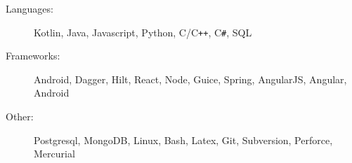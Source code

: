 

\begin{description}
  \item[Languages:]
    \hspace{.4em} 
    Kotlin, Java, Javascript, Python, C/C{}\verb!++!, C{}\verb!#!, SQL
  \item[Frameworks:]  
    Android, Dagger, Hilt, React, Node, Guice, Spring, AngularJS, Angular, Android
  \item[Other:]
    \hspace{2.9 em} 
    Postgresql, MongoDB, Linux, Bash, Latex, Git, Subversion, Perforce, Mercurial
\end{description}
